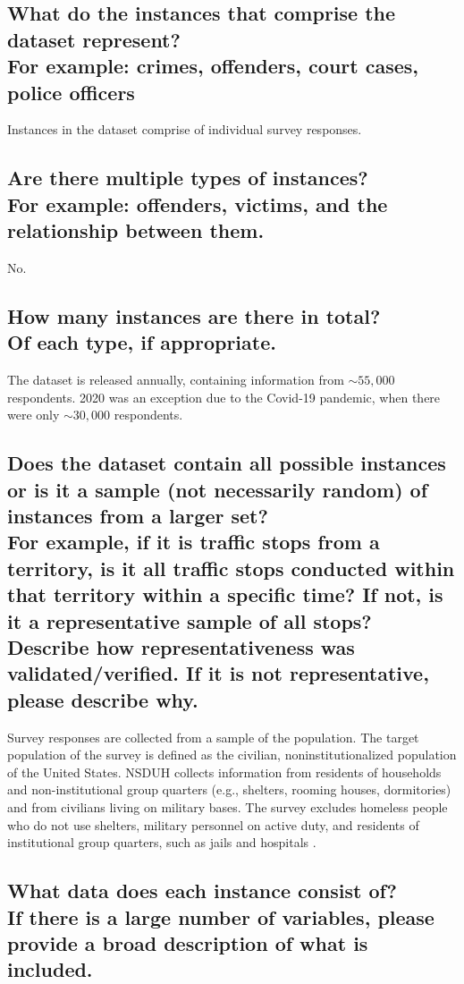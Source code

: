 \documentclass[letterpaper, 10 pt, conference]{ieeeconf}  %
\newcommand{\subtitle}[1]{{\\ \small \normalfont \color{purple} #1}}
\begin{document}
\subsection{What do the instances that comprise the dataset represent? \subtitle{For example: crimes, offenders, court cases, police officers}}

Instances in the dataset comprise of individual survey responses.

\subsection{Are there multiple types of instances? \subtitle{For example: offenders, victims, and the relationship between them.}}

No.

\subsection{How many instances are there in total? \subtitle{Of each type, if appropriate.}}

The dataset is released annually, containing information from $\sim 55,000$ respondents. 2020 was an exception due to the Covid-19 pandemic, when there were only $\sim 30,000$ respondents.

\subsection{Does the dataset contain all possible instances or is it a sample (not necessarily random) of instances from a larger set? \subtitle{For example, if it is traffic stops from a territory, is it all traffic stops conducted within that territory within a specific time? If not, is it a representative sample of all stops? Describe how representativeness was validated/verified. If it is not representative, please describe why.}}

Survey responses are collected from a sample of the population. The target population of the survey is defined as the civilian,
noninstitutionalized population of the United States. NSDUH collects information from residents of households and non-institutional group quarters (e.g., shelters, rooming houses, dormitories) and from civilians living on military bases. The survey excludes homeless people who do not use shelters, military personnel on active duty, and residents of institutional group quarters, such as jails and hospitals \cite{nsduh_method}.

\subsection{What data does each instance consist of? \subtitle{If there is a large number of variables, please provide a broad description of what is included.}}
\end{document}

